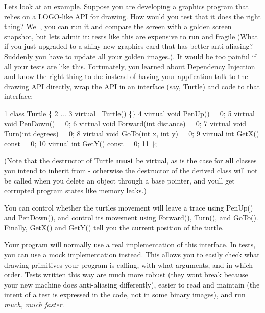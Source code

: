 Let\textquotesingle{}s look at an example. Suppose you are developing a graphics program that relies on a L\+O\+G\+O-\/like A\+PI for drawing. How would you test that it does the right thing? Well, you can run it and compare the screen with a golden screen snapshot, but let\textquotesingle{}s admit it\+: tests like this are expensive to run and fragile (What if you just upgraded to a shiny new graphics card that has better anti-\/aliasing? Suddenly you have to update all your golden images.). It would be too painful if all your tests are like this. Fortunately, you learned about Dependency Injection and know the right thing to do\+: instead of having your application talk to the drawing A\+PI directly, wrap the A\+PI in an interface (say, {\ttfamily Turtle}) and code to that interface\+:


\begin{DoxyCode}
1 class Turtle \{
2   ...
3   virtual ~Turtle() \{\}
4   virtual void PenUp() = 0;
5   virtual void PenDown() = 0;
6   virtual void Forward(int distance) = 0;
7   virtual void Turn(int degrees) = 0;
8   virtual void GoTo(int x, int y) = 0;
9   virtual int GetX() const = 0;
10   virtual int GetY() const = 0;
11 \};
\end{DoxyCode}


(Note that the destructor of {\ttfamily Turtle} {\bfseries must} be virtual, as is the case for {\bfseries all} classes you intend to inherit from -\/ otherwise the destructor of the derived class will not be called when you delete an object through a base pointer, and you\textquotesingle{}ll get corrupted program states like memory leaks.)

You can control whether the turtle\textquotesingle{}s movement will leave a trace using {\ttfamily Pen\+Up()} and {\ttfamily Pen\+Down()}, and control its movement using {\ttfamily Forward()}, {\ttfamily Turn()}, and {\ttfamily Go\+To()}. Finally, {\ttfamily Get\+X()} and {\ttfamily Get\+Y()} tell you the current position of the turtle.

Your program will normally use a real implementation of this interface. In tests, you can use a mock implementation instead. This allows you to easily check what drawing primitives your program is calling, with what arguments, and in which order. Tests written this way are much more robust (they won\textquotesingle{}t break because your new machine does anti-\/aliasing differently), easier to read and maintain (the intent of a test is expressed in the code, not in some binary images), and run {\itshape much, much faster}.

